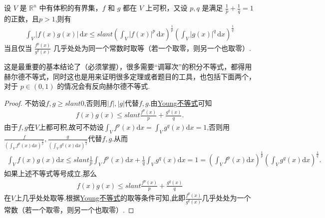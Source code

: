\documentclass[../../main.tex]{subfiles}
\begin{document}
\begin{theorem}[Hold不等式]\label{theorem:Hold(赫尔德)不等式(积分形式)}
设 $V$ 是 $\mathbb{R}^n$ 中有体积的有界集，$f$ 和 $g$ 都在 $V$ 上可积，又设 $p,q$ 是满足 $\frac{1}{p} + \frac{1}{q} = 1$ 的正数，且$p>1$,则有
\begin{align*}
\int_V |f(x)g(x)| \, \mathrm{d}x \leqslant slant \left( \int_V |f(x)|^p \, \mathrm{d}x \right)^{\frac{1}{p}} \left( \int_V |g(x)|^q \, \mathrm{d}x \right)^{\frac{1}{q}}
\end{align*}
当且仅当 $\frac{f^p(x)}{g^q(x)}$ 几乎处处为同一个常数时取等（若一个取零，则另一个也取零）.
\end{theorem}
\begin{remark}
这是最重要的基本结论了（必须掌握），很多需要“调幂次”的积分不等式，都得用赫尔德不等式，同时这也是用来证明很多定理或者题目的工具，也包括下面两个，对于 $p \in (0,1)$ 的情况会有反向赫尔德不等式.
\end{remark}
\begin{proof}
不妨设$f,g\geqslant slant 0$,否则用$|f|,|g|$代替$f,g$.由\hyperref[theorem:Young不等式]{Young不等式}可知
\begin{align*}
f(x)g(x) \leqslant slant \frac{f^p(x)}{p}+\frac{g^q(x)}{q}.
\end{align*}
由于$f,g$在$V$上都可积,故可不妨设$\int_V f^p(x) \mathrm{d}x=\int_V g^q(x) \mathrm{d}x=1$,否则用$\frac{f}{\left( \int_V f^p(x) \mathrm{d}x \right)^{\frac{1}{p}}},\frac{g}{\left( \int_V g^q(x) \mathrm{d}x \right)^{\frac{1}{q}}}$代替$f,g$.从而
\begin{align*}
\int_V f(x)g(x) \mathrm{d}x \leqslant slant \frac{1}{p}\int_V f^p(x) \mathrm{d}x+\frac{1}{q}\int_V g^q(x) \mathrm{d}x=1=\left( \int_V f^p(x) \mathrm{d}x \right)^{\frac{1}{p}}\left( \int_V g^q(x) \mathrm{d}x \right)^{\frac{1}{q}}.
\end{align*}
如果上述不等式等号成立,那么
\begin{align*}
f(x)g(x) \leqslant slant \frac{f^p(x)}{p}+\frac{g^q(x)}{q}
\end{align*}
在$V$上几乎处处取等.根据\hyperref[theorem:Young不等式]{Young不等式}的取等条件可知,此即$\frac{f^p(x)}{g^q(x)}$几乎处处为一个常数（若一个取零，则另一个也取零）.
\end{proof}
\end{document}
